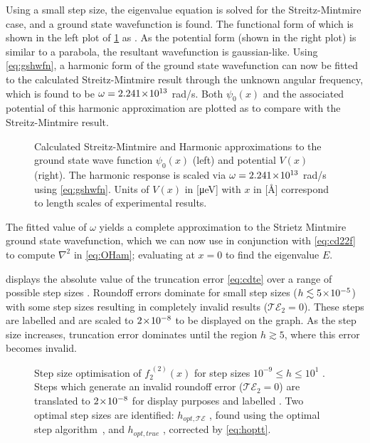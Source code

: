 Using a small step size, the eigenvalue equation is solved for the Streitz-Mintmire case, and a ground state wavefunction is found.
The functional form of which is shown in the left plot of \cref{fig:smvh} as .
As the potential form (shown in the right plot) is similar to a parabola, the resultant wavefunction is gaussian-like.
Using \cref{eq:gshwfn}, a harmonic form of the ground state wavefunction can now be fitted to the calculated Streitz-Mintmire result through the unknown angular frequency, which is found to be $\omega = 2.241\!\times\!10^{13}$ rad/s.
Both $\psi_0(x)$ and the associated potential of this harmonic approximation are plotted as  to compare with the Streitz-Mintmire result.
\begin{figure}[htp]
\centering
\resizebox{\widefigure}{!}{}
\parbox{\widefigure}{\caption[Harmonic Approximation to Strietz Mintmire]{\label{fig:smvh}Calculated Streitz-Mintmire  and Harmonic approximations  to the ground state wave function $\psi_0(x)$ (left) and potential $V(x)$ (right). The harmonic response is scaled via $\omega = 2.241\!\times\!10^{13}$ rad/s using \cref{eq:gshwfn}. Units of $V(x)$ in [μeV] with $x$ in [Å] correspond to length scales of experimental results.}}
\end{figure}

The fitted value of $\omega$ yields a complete approximation to the Strietz Mintmire ground state wavefunction, which we can now use in conjunction with \cref{eq:cd22f} to compute $\nabla^2$ in \cref{eq:OHam}; evaluating at $x = 0$ to find the eigenvalue $E$.

 displays the absolute value of the truncation error \cref{eq:cdte} over a range of possible step sizes .
Roundoff errors dominate for small step sizes ($h \lesssim 5\!\times\!10^{-5}$) with some step sizes resulting in completely invalid results (\ie $\mathcal{TE}_2 = 0$).
These steps are labelled  and are scaled to $2\!\times\!10^{-8}$ to be displayed on the graph.
As the step size increases, truncation error dominates until the region $h \gtrsim 5$, where this error becomes invalid.
\begin{figure}[htp]
\centering
\resizebox{\columnwidth}{!}{}
\caption[Step size optimisation of $f_2^{\;(2)}(x)$]{\label{fig:hopt3pt}Step size optimisation of $f_2^{\;(2)}(x)$ for step sizes $10^{-9}\!\leq\! h\! \leq\! 10^1$ . Steps which generate an invalid roundoff error (\ie $\mathcal{TE}_2 = 0$) are translated to $2\!\times\!10^{-8}$ for display purposes and labelled . Two optimal step sizes are identified: $h_{opt,\mathcal{TE}}$ , found using the optimal step algorithm~\cite{Mathur2012}, and $h_{opt,true}$ , corrected by \cref{eq:hoptt}.}
\end{figure}

